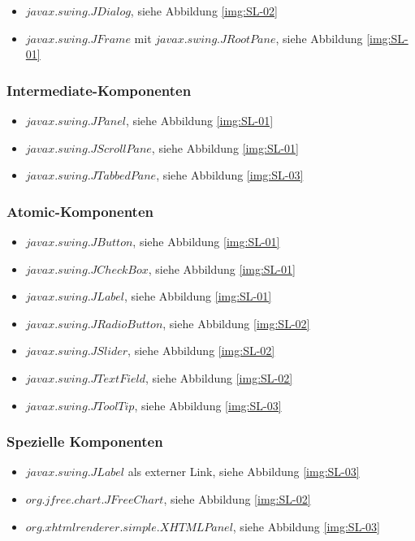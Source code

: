   \begin{itemize}
    \item \(javax.swing.JDialog\), siehe Abbildung \ref{img:SL-02}
    \item \(javax.swing.JFrame\) mit \(javax.swing.JRootPane\), siehe Abbildung
    \ref{img:SL-01}
  \end{itemize}
  
  \subsubsection{Intermediate-Komponenten}
  
  \begin{itemize}
    \item \(javax.swing.JPanel\), siehe Abbildung \ref{img:SL-01}
    \item \(javax.swing.JScrollPane\), siehe Abbildung \ref{img:SL-01}
    \item \(javax.swing.JTabbedPane\), siehe Abbildung \ref{img:SL-03}
  \end{itemize}
  
  \subsubsection{Atomic-Komponenten}
  
  \begin{itemize}
    \item \(javax.swing.JButton\), siehe Abbildung \ref{img:SL-01}
    \item \(javax.swing.JCheckBox\), siehe Abbildung \ref{img:SL-01}
    \item \(javax.swing.JLabel\), siehe Abbildung \ref{img:SL-01}
    \item \(javax.swing.JRadioButton\), siehe Abbildung \ref{img:SL-02}
    \item \(javax.swing.JSlider\), siehe Abbildung \ref{img:SL-02}
    \item \(javax.swing.JTextField\), siehe Abbildung \ref{img:SL-02}
    \item \(javax.swing.JToolTip\), siehe Abbildung \ref{img:SL-03}
  \end{itemize}
  
  \subsubsection{Spezielle Komponenten}
  
  \begin{itemize}
    \item \(javax.swing.JLabel\) als externer Link, siehe Abbildung
    \ref{img:SL-03}
    \item \(org.jfree.chart.JFreeChart\), siehe Abbildung \ref{img:SL-02}
    \item \(org.xhtmlrenderer.simple.XHTMLPanel\), siehe Abbildung
    \ref{img:SL-03}
  \end{itemize}
  
